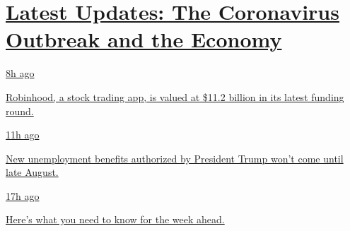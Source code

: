 \hypertarget{latest-updates-the-coronavirus-outbreak-and-the-economy}{%
\section{\texorpdfstring{\href{https://www.nytimes.com/live/2020/08/17/business/stock-market-today-coronavirus?action=click\&pgtype=Article\&state=default\&region=MAIN_CONTENT_1\&context=storylines_live_updates}{Latest
Updates: The Coronavirus Outbreak and the
Economy}}{Latest Updates: The Coronavirus Outbreak and the Economy}}\label{latest-updates-the-coronavirus-outbreak-and-the-economy}}

\href{https://www.nytimes.com/live/2020/08/17/business/stock-market-today-coronavirus?action=click\&pgtype=Article\&state=default\&region=MAIN_CONTENT_1\&context=storylines_live_updates\#robinhood-a-stock-trading-app-is-valued-at-11-2-billion-in-its-latest-funding-round}{8h
ago}

\href{https://www.nytimes.com/live/2020/08/17/business/stock-market-today-coronavirus?action=click\&pgtype=Article\&state=default\&region=MAIN_CONTENT_1\&context=storylines_live_updates\#robinhood-a-stock-trading-app-is-valued-at-11-2-billion-in-its-latest-funding-round}{Robinhood,
a stock trading app, is valued at \$11.2 billion in its latest funding
round.}

\href{https://www.nytimes.com/live/2020/08/17/business/stock-market-today-coronavirus?action=click\&pgtype=Article\&state=default\&region=MAIN_CONTENT_1\&context=storylines_live_updates\#new-unemployment-benefits-authorized-by-president-trump-wont-come-until-late-august}{11h
ago}

\href{https://www.nytimes.com/live/2020/08/17/business/stock-market-today-coronavirus?action=click\&pgtype=Article\&state=default\&region=MAIN_CONTENT_1\&context=storylines_live_updates\#new-unemployment-benefits-authorized-by-president-trump-wont-come-until-late-august}{New
unemployment benefits authorized by President Trump won't come until
late August.}

\href{https://www.nytimes.com/live/2020/08/17/business/stock-market-today-coronavirus?action=click\&pgtype=Article\&state=default\&region=MAIN_CONTENT_1\&context=storylines_live_updates\#heres-what-you-need-to-know-for-the-week-ahead}{17h
ago}

\href{https://www.nytimes.com/live/2020/08/17/business/stock-market-today-coronavirus?action=click\&pgtype=Article\&state=default\&region=MAIN_CONTENT_1\&context=storylines_live_updates\#heres-what-you-need-to-know-for-the-week-ahead}{Here's
what you need to know for the week ahead.}


